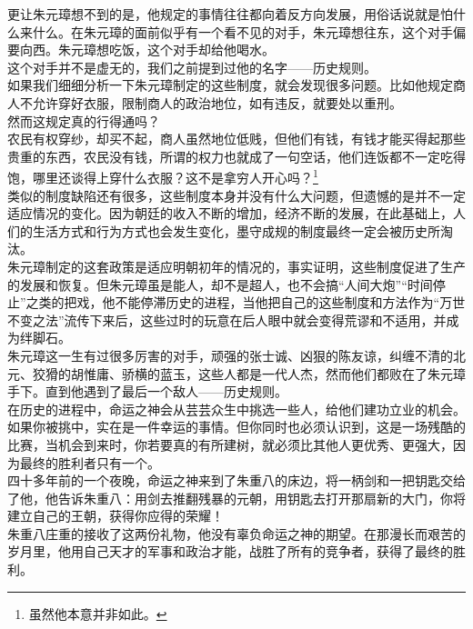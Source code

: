 \begin{multicols}{\theparacolNo}
更让朱元璋想不到的是，他规定的事情往往都向着反方向发展，用俗话说就是怕什么来什么。在朱元璋的面前似乎有一个看不见的对手，朱元璋想往东，这个对手偏要向西。朱元璋想吃饭，这个对手却给他喝水。\\

这个对手并不是虚无的，我们之前提到过他的名字——历史规则。\\

如果我们细细分析一下朱元璋制定的这些制度，就会发现很多问题。比如他规定商人不允许穿好衣服，限制商人的政治地位，如有违反，就要处以重刑。\\

然而这规定真的行得通吗？\\

农民有权穿纱，却买不起，商人虽然地位低贱，但他们有钱，有钱才能买得起那些贵重的东西，农民没有钱，所谓的权力也就成了一句空话，他们连饭都不一定吃得饱，哪里还谈得上穿什么衣服？这不是拿穷人开心吗？\footnote{虽然他本意并非如此。}\\

类似的制度缺陷还有很多，这些制度本身并没有什么大问题，但遗憾的是并不一定适应情况的变化。因为朝廷的收入不断的增加，经济不断的发展，在此基础上，人们的生活方式和行为方式也会发生变化，墨守成规的制度最终一定会被历史所淘汰。\\

朱元璋制定的这套政策是适应明朝初年的情况的，事实证明，这些制度促进了生产的发展和恢复。但朱元璋虽是能人，却不是超人，也不会搞“人间大炮”“时间停止”之类的把戏，他不能停滞历史的进程，当他把自己的这些制度和方法作为“万世不变之法”流传下来后，这些过时的玩意在后人眼中就会变得荒谬和不适用，并成为绊脚石。\\

朱元璋这一生有过很多厉害的对手，顽强的张士诚、凶狠的陈友谅，纠缠不清的北元、狡猾的胡惟庸、骄横的蓝玉，这些人都是一代人杰，然而他们都败在了朱元璋手下。直到他遇到了最后一个敌人——历史规则。\\

在历史的进程中，命运之神会从芸芸众生中挑选一些人，给他们建功立业的机会。如果你被挑中，实在是一件幸运的事情。但你同时也必须认识到，这是一场残酷的比赛，当机会到来时，你若要真的有所建树，就必须比其他人更优秀、更强大，因为最终的胜利者只有一个。\\

四十多年前的一个夜晚，命运之神来到了朱重八的床边，将一柄剑和一把钥匙交给了他，他告诉朱重八：用剑去推翻残暴的元朝，用钥匙去打开那扇新的大门，你将建立自己的王朝，获得你应得的荣耀！\\

朱重八庄重的接收了这两份礼物，他没有辜负命运之神的期望。在那漫长而艰苦的岁月里，他用自己天才的军事和政治才能，战胜了所有的竞争者，获得了最终的胜利。\\


\end{multicols}
